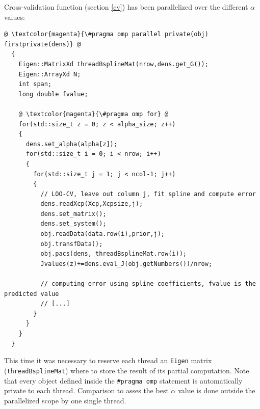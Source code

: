 Cross-validation function (section \ref{cv}) has been parallelized over the different $\alpha$ values:

\begin{lstlisting}
@ \textcolor{magenta}{\#pragma omp parallel private(obj) firstprivate(dens)} @
  {
    Eigen::MatrixXd threadBsplineMat(nrow,dens.get_G());
    Eigen::ArrayXd N;
    int span;
    long double fvalue;

    @ \textcolor{magenta}{\#pragma omp for} @
    for(std::size_t z = 0; z < alpha_size; z++)
    {
      dens.set_alpha(alpha[z]);
      for(std::size_t i = 0; i < nrow; i++)
      {
        for(std::size_t j = 1; j < ncol-1; j++) 
        {
          // LOO-CV, leave out column j, fit spline and compute error
          dens.readXcp(Xcp,Xcpsize,j);
          dens.set_matrix();
          dens.set_system();
          obj.readData(data.row(i),prior,j);
          obj.transfData();
          obj.pacs(dens, threadBsplineMat.row(i));
          Jvalues(z)+=dens.eval_J(obj.getNumbers())/nrow;

          // computing error using spline coefficients, fvalue is the predicted value
          // [...]
        }
      }
    }
  }
  \end{lstlisting}

This time it was necessary to reserve each thread an \verb|Eigen| matrix (\verb|threadBsplineMat|) where to store the result of its partial computation. Note that every object defined inside the \verb|#pragma omp| statement is automatically private to each thread. Comparison to asses the best $\alpha$ value is done outside the parallelized scope by one single thread.




